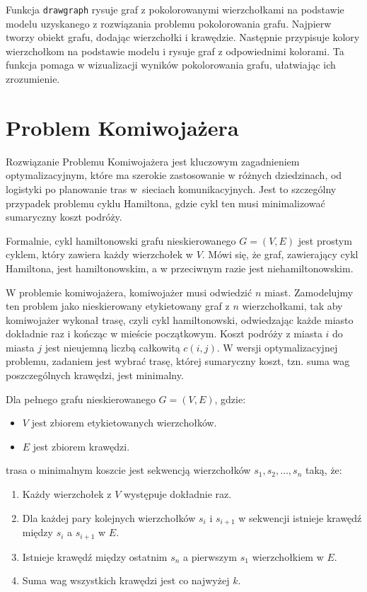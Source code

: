 

Funkcja \texttt{draw\textunderscore graph} rysuje graf z pokolorowanymi wierzchołkami na podstawie modelu uzyskanego z rozwiązania problemu pokolorowania grafu. Najpierw tworzy obiekt grafu, dodając wierzchołki i krawędzie. Następnie przypisuje kolory wierzchołkom na podstawie modelu i rysuje graf z odpowiednimi kolorami. Ta funkcja pomaga w wizualizacji wyników pokolorowania grafu, ułatwiając ich zrozumienie.



\section{Problem Komiwojażera}
Rozwiązanie Problemu Komiwojażera jest kluczowym zagadnieniem optymalizacyjnym, które ma szerokie zastosowanie w różnych dziedzinach, od logistyki po planowanie tras w~sieciach komunikacyjnych. Jest to szczególny przypadek problemu cyklu Hamiltona, gdzie cykl ten musi minimalizować sumaryczny koszt podróży. 

Formalnie, cykl hamiltonowski grafu nieskierowanego $G = (V, E)$ jest prostym cyklem, który zawiera każdy wierzchołek w \(V\). Mówi się, że graf, zawierający cykl Hamiltona, jest hamiltonowskim, a w przeciwnym razie jest niehamiltonowskim. 

W problemie komiwojażera, komiwojażer musi odwiedzić \(n\) miast. Zamodelujmy ten problem jako nieskierowany etykietowany graf z \(n\) wierzchołkami, tak aby komiwojażer wykonał trasę, czyli cykl hamiltonowski, odwiedzając każde miasto dokładnie raz i kończąc w mieście początkowym. Koszt podróży z miasta \(i\) do miasta \(j\) jest nieujemną liczbą całkowitą \(c(i, j)\). W wersji optymalizacyjnej problemu, zadaniem jest wybrać trasę, której sumaryczny koszt, tzn. suma wag poszczególnych krawędzi, jest minimalny.

Dla pełnego grafu nieskierowanego $G = (V, E)$, gdzie:
\begin{itemize}
	\item \(V\) jest zbiorem etykietowanych wierzchołków.
	\item \(E\) jest zbiorem krawędzi.
\end{itemize}
trasa o minimalnym koszcie jest sekwencją wierzchołków $s_1, s_2, …, s_n$ taką, że:
\begin{enumerate}
	\item Każdy wierzchołek z \(V\) występuje dokładnie raz.
	\item Dla każdej pary kolejnych wierzchołków \(s_i\) i \(s_{i+1}\) w sekwencji istnieje krawędź między \(s_i\) a \(s_{i+1}\) w \(E\).
	\item Istnieje krawędź między ostatnim \(s_n\) a pierwszym \(s_1\) wierzchołkiem w \(E\).
	\item Suma wag wszystkich krawędzi jest co najwyżej \(k\).
\end{enumerate}

